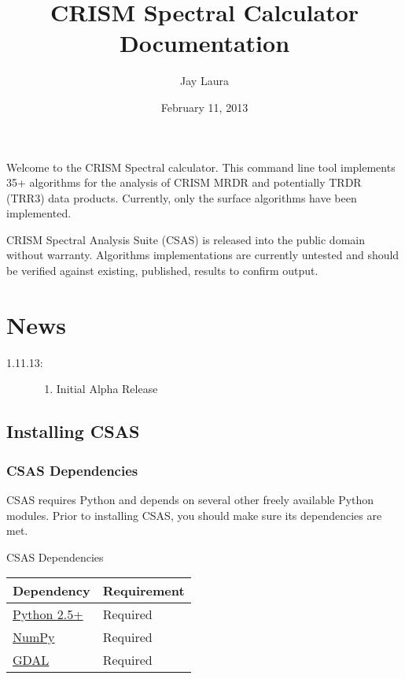\documentclass[letterpaper,10pt,english]{sphinxmanual}
\title{CRISM Spectral Calculator Documentation}
\date{February 11, 2013}
\author{Jay Laura}
\begin{document}
\maketitle
\tableofcontents
{}\label{index::doc}


Welcome to the CRISM Spectral calculator.  This command line tool implements 35+ algorithms for the analysis of CRISM MRDR and potentially TRDR (TRR3) data products.  Currently, only the surface algorithms have been implemented.

CRISM Spectral Analysis Suite (CSAS) is released into the public domain without warranty.  Algorithms implementations are currently untested and should be verified against existing, published, results to confirm output.


\chapter{News}
\label{index:welcome-to-the-crism-spectral-analysis-suite}\label{index:news}\begin{description}
\item[{1.11.13:}] \leavevmode\begin{enumerate}
\item {} 
Initial Alpha Release

\end{enumerate}

\end{description}


\section{Installing CSAS}
\label{Installation:installation}\label{Installation::doc}\label{Installation:installing-csas}

\subsection{CSAS Dependencies}
\label{Installation:csas-dependencies}
CSAS requires Python and depends on several other freely available Python
modules. Prior to installing CSAS, you should make sure its dependencies are met.


\begin{threeparttable}
\capstart\caption{CSAS Dependencies}

\begin{tabulary}{\linewidth}{|L|L|}
\hline
\textbf{
Dependency
} & \textbf{
Requirement
}\\\hline

\href{http://www.python.org}{Python 2.5+}
 & 
Required
\\\hline

\href{http://numpy.scipy.org/}{NumPy}
 & 
Required
\\\hline

\href{http://gdal.org//}{GDAL}
 & 
Required
\\\hline
\end{tabulary}

\end{threeparttable}
\end{document}
